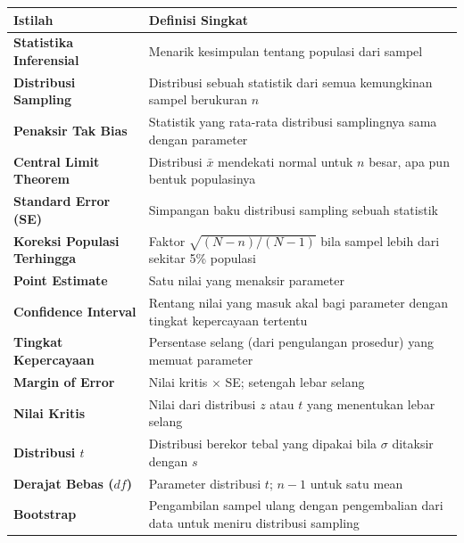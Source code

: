 \documentclass[
  indonesian,
  letterpaper,
]{book}
\newcounter{none} %
\begin{document}
{\def\LTcaptype{none} %
\begin{longtable}[]{@{}
  >{\raggedright\arraybackslash}p{}
  >{\raggedright\arraybackslash}p{}@{}}
\toprule\noalign{}
\begin{minipage}[b]{\linewidth}\raggedright
Istilah
\end{minipage} & \begin{minipage}[b]{\linewidth}\raggedright
Definisi Singkat
\end{minipage} \\
\midrule\noalign{}
\endhead
\bottomrule\noalign{}
\endlastfoot
\textbf{Statistika Inferensial} & Menarik kesimpulan tentang populasi
dari sampel \\
\textbf{Distribusi Sampling} & Distribusi sebuah statistik dari semua
kemungkinan sampel berukuran \(n\) \\
\textbf{Penaksir Tak Bias} & Statistik yang rata-rata distribusi
samplingnya sama dengan parameter \\
\textbf{Central Limit Theorem} & Distribusi \(\bar{x}\) mendekati normal
untuk \(n\) besar, apa pun bentuk populasinya \\
\textbf{Standard Error (SE)} & Simpangan baku distribusi sampling sebuah
statistik \\
\textbf{Koreksi Populasi Terhingga} & Faktor \(\sqrt{(N - n)/(N - 1)}\)
bila sampel lebih dari sekitar 5\% populasi \\
\textbf{Point Estimate} & Satu nilai yang menaksir parameter \\
\textbf{Confidence Interval} & Rentang nilai yang masuk akal bagi
parameter dengan tingkat kepercayaan tertentu \\
\textbf{Tingkat Kepercayaan} & Persentase selang (dari pengulangan
prosedur) yang memuat parameter \\
\textbf{Margin of Error} & Nilai kritis \(\times\) SE; setengah lebar
selang \\
\textbf{Nilai Kritis} & Nilai dari distribusi \(z\) atau \(t\) yang
menentukan lebar selang \\
\textbf{Distribusi \(t\)} & Distribusi berekor tebal yang dipakai bila
\(\sigma\) ditaksir dengan \(s\) \\
\textbf{Derajat Bebas (\(df\))} & Parameter distribusi \(t\); \(n - 1\)
untuk satu mean \\
\textbf{Bootstrap} & Pengambilan sampel ulang dengan pengembalian dari
data untuk meniru distribusi sampling \\
\end{longtable}
}
\end{document}
